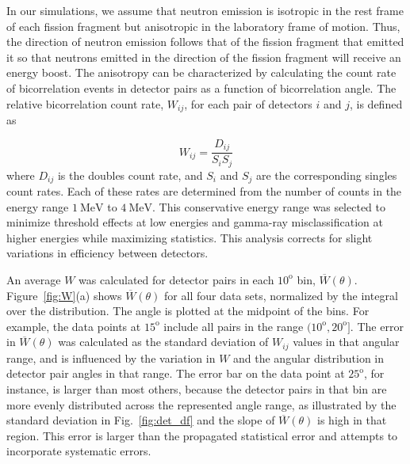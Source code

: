 \documentclass[preprint,12pt]{elsarticle}
\newcommand{\fig}[1]     {Fig.~\ref{#1}}
\newcommand{\figfirst}[1]  {Figure~\ref{#1}}
\newcommand{\Si}            {\ensuremath{S_{i}}\xspace}
\newcommand{\Sj}            {\ensuremath{S_{j}}\xspace}
\newcommand{\Dij}            {\ensuremath{D_{ij}}\xspace}
\newcommand{\W}              {\ensuremath{W}\xspace}
\newcommand{\Wij}            {\ensuremath{W_{ij}}\xspace}
\newcommand{\Wtheta}         {\ensuremath{\overline{W}(\theta)}\xspace}
\newcommand{\genunit}[2]{\ensuremath{#1~\text{#2}}\xspace}
\newcommand{\MeV}[1]    {\genunit{#1}{MeV}}
\newcommand{\degrees}[1]{\ensuremath{#1^{\mathrm{o}}}\xspace}
\begin{document}
In our simulations, we assume that neutron emission is isotropic in the rest frame of each fission fragment but anisotropic in the laboratory frame of motion. Thus, the direction of neutron emission follows that of the fission fragment that emitted it so that neutrons emitted in the direction of the fission fragment will receive an energy boost. The anisotropy can be characterized by calculating the count rate of bicorrelation events in detector pairs as a function of bicorrelation angle. The relative bicorrelation count rate, \Wij, for each pair of detectors $i$ and $j$, is defined as~\cite{Mueller2016}

\begin{equation}
\label{eq:Wij}
\Wij = \frac{\Dij}{\Si \Sj}
\end{equation}
where \Dij is the doubles count rate, and \Si and \Sj are the corresponding singles count rates. Each of these rates are determined from the number of counts in the energy range \MeV{1} to \MeV{4}. This conservative energy range was selected to minimize threshold effects at low energies and gamma-ray misclassification at higher energies while maximizing statistics. This analysis corrects for slight variations in efficiency between detectors.

An average \W was calculated for detector pairs in each \degrees{10}  bin, \Wtheta. \figfirst{fig:W}(a) shows \Wtheta for all four data sets, normalized by the integral over the distribution. The angle is plotted at the midpoint of the bins. For example, the data points at \degrees{15} include all pairs in the range $(\degrees{10},\degrees{20}]$. The error in \Wtheta was calculated as the standard deviation of \Wij values in that angular range, and is influenced by the variation in \W and the angular distribution in detector pair angles in that range. The error bar on the data point at \degrees{25}, for instance, is larger than most others, because the detector pairs in that bin are more evenly distributed across the represented angle range, as illustrated by the standard deviation in \fig{fig:det_df} and the slope of \Wtheta is high in that region. This error is larger than the propagated statistical error and attempts to incorporate systematic errors. 
\end{document}

